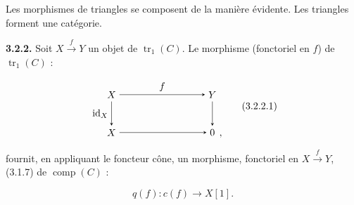 Les morphismes de triangles se composent de la manière évidente.
Les triangles forment une catégorie.

\noindent\textbf{3.2.2.}\quad
{}
Soit $X\xrightarrow{f}Y$ un objet de $\operatorname{tr}_1(C)$. Le morphisme
(fonctoriel en $f$) de $\operatorname{tr}_1(C)$ :

\begin{equation}
  \begin{tikzpicture}[>=stealth,baseline=(current bounding box.center)]
    \node (X)  at (0,1.35) {$X$};
    \node (Y)  at (3.6,1.35) {$Y$};
    \node (Xp) at (0,0) {$X$};
    \node (Z)  at (3.6,0) {$0$};
    \node[anchor=base west,inner sep=0pt,xshift=.08em] at (Z.base east) {$,$};
    \draw[->] (X) -- node[above] {$f$} (Y);
    \draw[->] (X) -- node[left] {$\operatorname{id}_X$} (Xp);
    \draw[->] (Y) -- (Z);
    \draw[->] (Xp) -- (Z);
  \end{tikzpicture}
  \tag{3.2.2.1}
\end{equation}

fournit, en appliquant le foncteur cône, un morphisme, fonctoriel en
$X\xrightarrow{f}Y$, (3.1.7) de $\operatorname{comp}(C)$ :

\begin{equation}
  q(f)\colon c(f)\longrightarrow X[1].
  \tag{3.2.2.2}
\end{equation}
